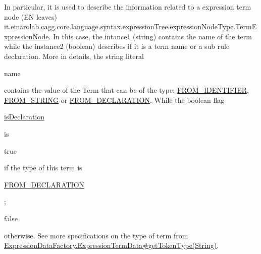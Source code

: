 In particular, it is used to describe the information related to a expression term node (E\-N leaves) \hyperlink{classit_1_1emarolab_1_1cagg_1_1core_1_1language_1_1syntax_1_1expressionTree_1_1expressionNodeType_1_1TermExpressionNode}{it.\-emarolab.\-cagg.\-core.\-language.\-syntax.\-expression\-Tree.\-expression\-Node\-Type.\-Term\-Expression\-Node}. In this case, the intance1 (string) contains the name of the term while the instance2 (boolean) describes if it is a term name or a sub rule declaration. More in details, the string literal
\begin{DoxyCode}
name 
\end{DoxyCode}
 contains the value of the Term that can be of the type\-: \hyperlink{classit_1_1emarolab_1_1cagg_1_1core_1_1language_1_1syntax_1_1expressionTree_1_1ExpressionDataFactory_1_1ExpressionTermData_a47ff9900ae9a392118de8e056b1f334c}{F\-R\-O\-M\-\_\-\-I\-D\-E\-N\-T\-I\-F\-I\-E\-R}, \hyperlink{classit_1_1emarolab_1_1cagg_1_1core_1_1language_1_1syntax_1_1expressionTree_1_1ExpressionDataFactory_1_1ExpressionTermData_a721daea5805288e2fbe0aa006e41b1bc}{F\-R\-O\-M\-\_\-\-S\-T\-R\-I\-N\-G} or \hyperlink{classit_1_1emarolab_1_1cagg_1_1core_1_1language_1_1syntax_1_1expressionTree_1_1ExpressionDataFactory_1_1ExpressionTermData_ab7b629b4ac570eba986cfb0ed8ca3b48}{F\-R\-O\-M\-\_\-\-D\-E\-C\-L\-A\-R\-A\-T\-I\-O\-N}. While the boolean flag
\begin{DoxyCode}
\hyperlink{classit_1_1emarolab_1_1cagg_1_1core_1_1language_1_1syntax_1_1expressionTree_1_1ExpressionDataFactory_1_1ExpressionTermData_a2c2f945f4b99916a214d6888f6f3217c}{isDeclaration} 
\end{DoxyCode}
 is
\begin{DoxyCode}
\textcolor{keyword}{true} 
\end{DoxyCode}
 if the type of this term is
\begin{DoxyCode}
\hyperlink{classit_1_1emarolab_1_1cagg_1_1core_1_1language_1_1syntax_1_1expressionTree_1_1ExpressionDataFactory_1_1ExpressionTermData_ab7b629b4ac570eba986cfb0ed8ca3b48}{FROM\_DECLARATION} 
\end{DoxyCode}
 ; 
\begin{DoxyCode}
\textcolor{keyword}{false} 
\end{DoxyCode}
 otherwise. See more specifications on the type of term from \hyperlink{classit_1_1emarolab_1_1cagg_1_1core_1_1language_1_1syntax_1_1expressionTree_1_1ExpressionDataFactory_1_1ExpressionTermData_ace7d61d502db7ff1a402ac0e6e983e0a}{Expression\-Data\-Factory.\-Expression\-Term\-Data\#get\-Token\-Type(\-String)}. 

